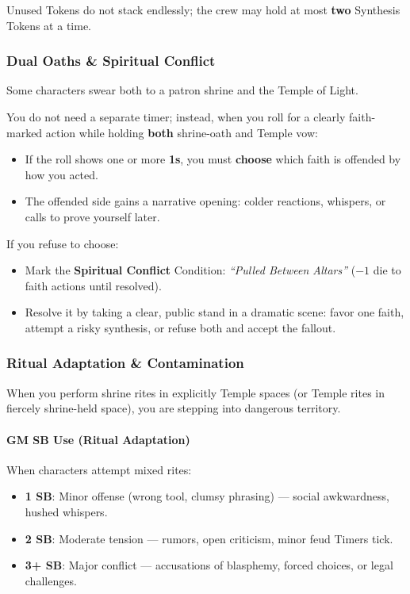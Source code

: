 \documentclass[11pt]{article}
\begin{document}
Unused Tokens do not stack endlessly; the crew may hold at most \textbf{two} Synthesis Tokens at a
time.

\subsubsection*{Dual Oaths \& Spiritual Conflict}

Some characters swear both to a patron shrine and the Temple of Light.

You do not need a separate timer; instead, when you roll for a clearly faith-marked action while
holding \textbf{both} shrine-oath and Temple vow:

\begin{itemize}
  \item If the roll shows one or more \textbf{1s}, you must \textbf{choose} which faith is
        offended by how you acted.
  \item The offended side gains a narrative opening: colder reactions, whispers, or calls to
        prove yourself later.
\end{itemize}

If you refuse to choose:

\begin{itemize}
  \item Mark the \textbf{Spiritual Conflict} Condition: \emph{``Pulled Between Altars''}
        (\(-1\) die to faith actions until resolved).
  \item Resolve it by taking a clear, public stand in a dramatic scene: favor one faith, attempt
        a risky synthesis, or refuse both and accept the fallout.
\end{itemize}

\subsubsection*{Ritual Adaptation \& Contamination}

When you perform shrine rites in explicitly Temple spaces (or Temple rites in fiercely shrine-held
space), you are stepping into dangerous territory.

\paragraph*{GM SB Use (Ritual Adaptation)}
When characters attempt mixed rites:
\begin{itemize}
  \item \textbf{1 SB}: Minor offense (wrong tool, clumsy phrasing) --- social awkwardness,
        hushed whispers.
  \item \textbf{2 SB}: Moderate tension --- rumors, open criticism, minor feud Timers tick.
  \item \textbf{3+ SB}: Major conflict --- accusations of blasphemy, forced choices, or legal
        challenges.
\end{itemize}
\end{document}
